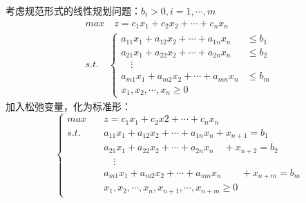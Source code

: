 \documentclass{book}
\begin{document}
考虑规范形式的线性规划问题：$b_i>0,i=1,\cdots,m$
$$
\begin{aligned}
    &max\quad z=c_1x_1+c_2x_2+\cdots+c_nx_n&\\
    &s.t.\quad
    \begin{cases}
        a_{11}x_1+a_{12}x_2+\cdots+a_{1n}x_n&\le b_1\\
        a_{21}x_1+a_{22}x_2+\cdots+a_{2n}x_n&\le b_2\\
        \quad\vdots\\
        a_{m1}x_1+a_{m2}x_2+\cdots+a_{mn}x_n&\le b_m\\
        x_1,x_2,\cdots,x_n\ge0
    \end{cases}
\end{aligned}
$$
加入松弛变量，化为标准形：
\begin{equation}
    \begin{cases}
        max\quad &z=c_1x_1+c_2x2+\cdots+c_nx_n \\
        s.t.\quad &a_{11}x_1+a_{12}x_2+\cdots+a_{1n}x_n +x_{n+1}=b_1\\
        &a_{21}x_1+a_{22}x_2+\cdots+a_{2n}x_n \quad+x_{n+2}=b_2\\
        &\quad\vdots\\
        &a_{m1}x_1+a_{m2}x_2+\cdots+a_{mn}x_n \quad\quad+x_{n+m}=b_m\\
        &x_1,x_2,\cdots,x_n,x_{n+1},\cdots,x_{n+m}\ge0
    \end{cases}
    \label{con: eq2.2}
\end{equation}
\end{document}
